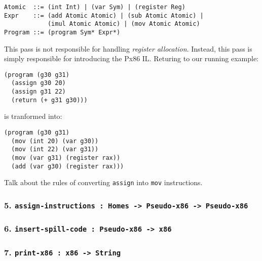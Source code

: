 \documentclass[12pt]{article}
\begin{document}
\begin{verbatim}
Atomic  ::= (int Int) | (var Sym) | (register Reg)
Expr    ::= (add Atomic Atomic) | (sub Atomic Atomic) | 
            (imul Atomic Atomic) | (mov Atomic Atomic)
Program ::= (program Sym* Expr*)
\end{verbatim}

This pass is not responsible for handling \textit{register allocation}. Instead,
this pass is simply responsible for introducing the Px86 IL. Returing to our
running example:
\begin{verbatim}
(program (g30 g31) 
  (assign g30 20)
  (assign g31 22)
  (return (+ g31 g30)))
\end{verbatim}
is tranformed into:
\begin{verbatim}
(program (g30 g31)
  (mov (int 20) (var g30))
  (mov (int 22) (var g31))
  (mov (var g31) (register rax))
  (add (var g30) (register rax)))
\end{verbatim}

Talk about the rules of converting {\tt assign} into {\tt mov} instructions.
\subsubsection*{5. {\tt assign-instructions : Homes -> Pseudo-x86 -> Pseudo-x86}}
\subsubsection*{6. {\tt insert-spill-code : Pseudo-x86 -> x86}}
\subsubsection*{7. {\tt print-x86 : x86 -> String}}
\end{document}
